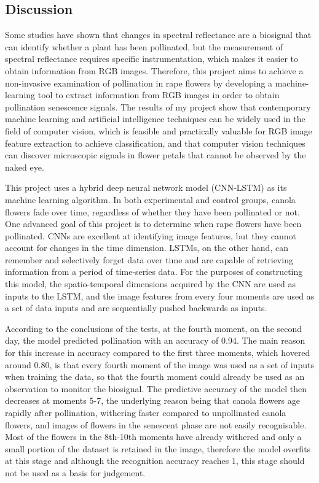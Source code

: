 \documentclass[11pt,a4paper]{article}
\begin{document}
\begin{spacing}{1.5}
\section{Discussion}
Some studies\citep{reif2008analysis} have shown that changes in spectral reflectance are a biosignal that can identify whether a plant has been pollinated, but the measurement of spectral reflectance requires specific instrumentation, which makes it easier to obtain information from RGB images. Therefore, this project aims to achieve a non-invasive examination of pollination in rape flowers by developing a machine-learning tool to extract information from RGB images in order to obtain pollination senescence signals. The results of my project show that contemporary machine learning and artificial intelligence techniques can be widely used in the field of computer vision, which is feasible and practically valuable for RGB image feature extraction to achieve classification, and that computer vision techniques can discover microscopic signals in flower petals that cannot be observed by the naked eye.

This project uses a hybrid deep neural network model (CNN-LSTM) as its machine learning algorithm. In both experimental and control groups, canola flowers fade over time, regardless of whether they have been pollinated or not. One advanced goal of this project is to determine when rape flowers have been pollinated. CNNs are excellent at identifying image features, but they cannot account for changes in the time dimension. LSTMs, on the other hand, can remember and selectively forget data over time and are capable of retrieving information from a period of time-series data. For the purposes of constructing this model, the spatio-temporal dimensions acquired by the CNN are used as inputs to the LSTM, and the image features from every four moments are used as a set of data inputs and are sequentially pushed backwards as inputs.

According to the conclusions of the tests, at the fourth moment, on the second day, the model predicted pollination with an accuracy of 0.94. The main reason for this increase in accuracy compared to the first three moments, which hovered around 0.80, is that every fourth moment of the image was used as a set of inputs when training the data, so that the fourth moment could already be used as an observation to monitor the biosignal. The predictive accuracy of the model then decreases at moments 5-7, the underlying reason being that canola flowers age rapidly after pollination, withering faster compared to unpollinated canola flowers, and images of flowers in the senescent phase are not easily recognisable. Most of the flowers in the 8th-10th moments have already withered and only a small portion of the dataset is retained in the image, therefore the model overfits at this stage and although the recognition accuracy reaches 1, this stage should not be used as a basis for judgement.


\end{spacing}
\end{document}
